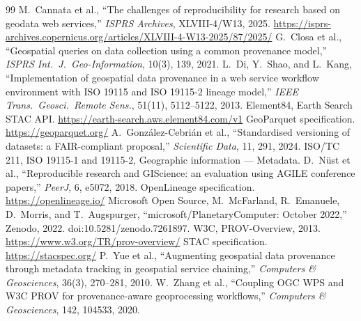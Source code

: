 \documentclass[11pt,a4paper]{article}
\begin{document}
\begin{thebibliography}{99}
\small
{} M.~Cannata et al., ``The challenges of reproducibility for research based on geodata web services,'' \emph{ISPRS Archives}, XLVIII-4/W13, 2025. \url{https://isprs-archives.copernicus.org/articles/XLVIII-4-W13-2025/87/2025/}
 G.~Closa et al., ``Geospatial queries on data collection using a common provenance model,'' \emph{ISPRS Int.\ J.\ Geo-Information}, 10(3), 139, 2021.
 L.~Di, Y.~Shao, and L.~Kang, ``Implementation of geospatial data provenance in a web service workflow environment with ISO 19115 and ISO 19115-2 lineage model,'' \emph{IEEE Trans.\ Geosci.\ Remote Sens.}, 51(11), 5112--5122, 2013.
 Element84, Earth Search STAC API. \url{https://earth-search.aws.element84.com/v1}
 GeoParquet specification. \url{https://geoparquet.org/}
 A.~Gonz\'alez-Cebri\'an et al., ``Standardised versioning of datasets: a FAIR-compliant proposal,'' \emph{Scientific Data}, 11, 291, 2024.
 ISO/TC 211, ISO 19115-1 and 19115-2, Geographic information --- Metadata.
 D.~N\"ust et al., ``Reproducible research and GIScience: an evaluation using AGILE conference papers,'' \emph{PeerJ}, 6, e5072, 2018.
 OpenLineage specification. \url{https://openlineage.io/}
 Microsoft Open Source, M.~McFarland, R.~Emanuele, D.~Morris, and T.~Augspurger, ``microsoft/PlanetaryComputer: October 2022,'' Zenodo, 2022. doi:10.5281/zenodo.7261897.
 W3C, PROV-Overview, 2013. \url{https://www.w3.org/TR/prov-overview/}
 STAC specification. \url{https://stacspec.org/}
 P.~Yue et al., ``Augmenting geospatial data provenance through metadata tracking in geospatial service chaining,'' \emph{Computers \& Geosciences}, 36(3), 270--281, 2010.
 W.~Zhang et al., ``Coupling OGC WPS and W3C PROV for provenance-aware geoprocessing workflows,'' \emph{Computers \& Geosciences}, 142, 104533, 2020.
\end{thebibliography}
\end{document}
